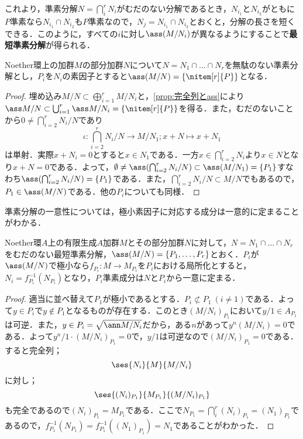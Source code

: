 これより，準素分解$N=\bigcap_i^r N_i$がむだのない分解であるとき，$N_{i_1}$と$N_{i_2}$がともに$ P$準素なら$N_{i_1}\cap N_{i_2}$も$ P$準素なので，$N_j=N_{i_1}\cap N_{i_2}$とおくと，分解の長さを短くできる．このように，すべての$i$に対し$\ass (M/N_i)$が異なるようにすることで\textbf{最短準素分解}が得られる．
\begin{thm}
	Noether環上の加群$M$の部分加群$N$について$N=N_1\cap\dots\cap N_r$を無駄のない準素分解とし，$ P_i$を$N_i$の素因子とすると$\ass (M/N)=\{\nitem[r]{ P}\}$となる．
\end{thm}
\begin{proof}
	埋め込み$M/N\subset\bigoplus_{i=1}^rM/N_i$と，\ref{prop:完全列とass}により$\ass M/N\subset \bigcup_{i=1}^r\ass M/N_i=\{\nitem[r]{ P}\}$を得る．また，むだのないことから$0\neq\bigcap_{i=2}^r N_i/N$であり
	\[\iota:\bigcap_{i=2}^rN_i/N\longrightarrow M/N_1;x+N\longmapsto x+N_1\]
	は単射．実際$x+N_i=0$とすると$x\in N_1$である．一方$x\in\bigcap_{i=2}^r N_i$より$x\in N$となり$x+N=0$である．よって，$\emptyset\neq\ass(\bigcap_{i=2}^r N_i/N)\subset\ass (M/N_1)=\{ P_1\}$すなわち$\ass(\bigcap_{i=2}^r N_i/N)=\{ P_1\}$である．また，$\bigcap_{i=2}^r N_i/N\subset M/N$でもあるので，$ P_1\in\ass (M/N)$である．他の$ P_i$についても同様．
\end{proof}

準素分解の一意性については，極小素因子に対応する成分は一意的に定まることがわかる．
\begin{thm}\label{thm:準素成分の一意性}
	Noether環$A$上の有限生成$A$加群$M$とその部分加群$N$に対して，$N=N_1\cap\dots\cap N_r$をむだのない最短準素分解，$\ass(M/N)=\{P_1,\dots,P_r\}$とおく．$P_i$が$\ass(M/N)$で極小なら$f_{P_i}:M\longrightarrow M_{P_i}$を$P_i$における局所化とすると，$N_i=f^{-1}_{P_i}(N_{P_i})$となり，$P_i$準素成分は$N$と$P_i$から一意に定まる．
\end{thm}
\begin{proof}
	適当に並べ替えて$P_1$が極小であるとする．$P_i\not\subset P_1~(i\neq1)$である．よって$y\in P_i$で$y\not\in P_1$となるものが存在する．このとき$(M/N_i)_{P_1}$において$y/1\in A_{P_1}$は可逆．また，$y\in P_i=\sqrt{\ann M/N_i}$だから，ある$n$があって$y^n(M/N_i)=0$である．よって$y^n/1\cdot (M/N_i)_{P_1}=0$で，$y/1$は可逆なので$(M/N_i)_{P_1}=0$である．すると完全列；
	\[\ses{N_i}{M}{M/N_i}\]
	に対し；
	\[\ses{(N_i)_{P_1}}{M_{P_1}}{(M/N_i)_{P_1}}\]
	も完全であるので$(N_i)_{P_1}=M_{P_1}$である．ここで$N_{P_1}=\bigcap_i^r (N_i)_{P_1}=(N_1)_{P_1}$であるので，$f^{-1}_{P_1}(N_{P_1})=f^{-1}_{P_1}((N_1)_{P_1})=N_1$であることがわかった．
\end{proof}


